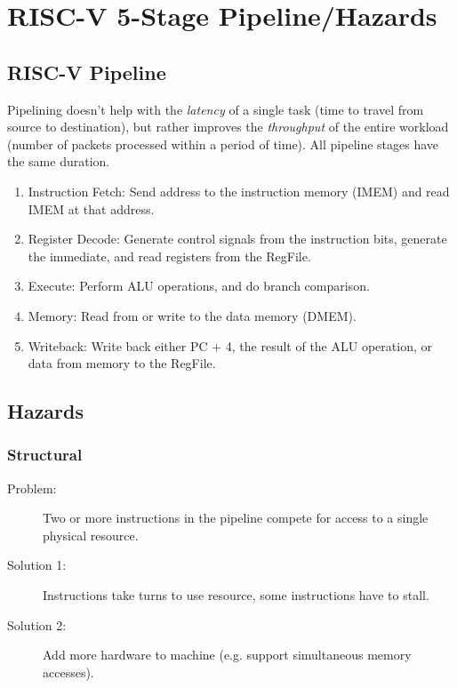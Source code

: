 \chapter{RISC-V 5-Stage Pipeline/Hazards}

\section{RISC-V Pipeline}
Pipelining doesn't help with the \emph{latency} of a single task (time to travel from source to destination), but rather improves the \emph{throughput} of the entire workload (number of packets processed within a period of time). All pipeline stages have the same duration.
\begin{enumerate}
    \item Instruction Fetch: Send address to the instruction memory (IMEM) and read IMEM at that address.
    \item Register Decode: Generate control signals from the instruction bits, generate the immediate, and read registers from the RegFile.
    \item Execute: Perform ALU operations, and do branch comparison.
    \item Memory: Read from or write to the data memory (DMEM).
    \item Writeback: Write back either PC + 4, the result of the ALU operation, or data from memory to the RegFile.
\end{enumerate}

\section{Hazards}
\subsection{Structural}
\begin{description}
	\item[Problem:] Two or more instructions in the pipeline compete for access to a single physical resource.
	\item[Solution 1:] Instructions take turns to use resource, some instructions have to stall.
	\item[Solution 2:] Add more hardware to machine (e.g. support simultaneous memory accesses).
\end{description}

